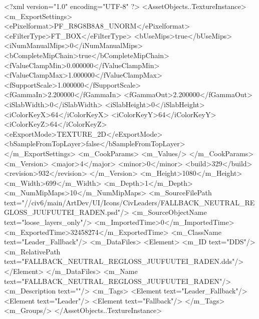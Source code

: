 <?xml version="1.0" encoding="UTF-8" ?>
<AssetObjects..TextureInstance>
	<m_ExportSettings>
		<ePixelformat>PF_R8G8B8A8_UNORM</ePixelformat>
		<eFilterType>FT_BOX</eFilterType>
		<bUseMips>true</bUseMips>
		<iNumManualMips>0</iNumManualMips>
		<bCompleteMipChain>true</bCompleteMipChain>
		<fValueClampMin>0.000000</fValueClampMin>
		<fValueClampMax>1.000000</fValueClampMax>
		<fSupportScale>1.000000</fSupportScale>
		<fGammaIn>2.200000</fGammaIn>
		<fGammaOut>2.200000</fGammaOut>
		<iSlabWidth>0</iSlabWidth>
		<iSlabHeight>0</iSlabHeight>
		<iColorKeyX>64</iColorKeyX>
		<iColorKeyY>64</iColorKeyY>
		<iColorKeyZ>64</iColorKeyZ>
		<eExportMode>TEXTURE_2D</eExportMode>
		<bSampleFromTopLayer>false</bSampleFromTopLayer>
	</m_ExportSettings>
	<m_CookParams>
		<m_Values/>
	</m_CookParams>
	<m_Version>
		<major>4</major>
		<minor>0</minor>
		<build>329</build>
		<revision>932</revision>
	</m_Version>
	<m_Height>1080</m_Height>
	<m_Width>699</m_Width>
	<m_Depth>1</m_Depth>
	<m_NumMipMaps>10</m_NumMipMaps>
	<m_SourceFilePath text="//civ6/main/ArtDev/UI/Icons/CivLeaders/FALLBACK_NEUTRAL_REGLOSS_JUUFUUTEI_RADEN.psd"/>
	<m_SourceObjectName text="loose_layers_only"/>
	<m_ImportedTime>0</m_ImportedTime>
	<m_ExportedTime>32458274</m_ExportedTime>
	<m_ClassName text="Leader_Fallback"/>
	<m_DataFiles>
		<Element>
			<m_ID text="DDS"/>
			<m_RelativePath text="FALLBACK_NEUTRAL_REGLOSS_JUUFUUTEI_RADEN.dds"/>
		</Element>
	</m_DataFiles>
	<m_Name text="FALLBACK_NEUTRAL_REGLOSS_JUUFUUTEI_RADEN"/>
	<m_Description text=""/>
	<m_Tags>
		<Element text="Leader_Fallback"/>
		<Element text="Leader"/>
		<Element text="Fallback"/>
	</m_Tags>
	<m_Groups/>
</AssetObjects..TextureInstance>

